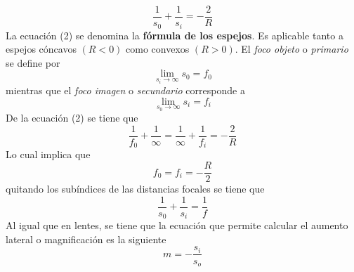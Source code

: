 \documentclass[13,twocolumn,letterpaper]{article}
\begin{document}
{\begin{equation}
\dfrac{1}{s_{0}}+\dfrac{1}{s_{i}}=-\dfrac{2}{R}
\end{equation}
La ecuación (2) se denomina la \textbf{fórmula de los espejos}. Es aplicable tanto a espejos cóncavos $(R<0)$ como convexos $(R>0)$. El \emph{foco objeto } o \emph{primario} se define por 
$$\lim_{s_{i}\rightarrow\infty}s_{0}=f_{0}$$
mientras que el \emph{foco imagen} o \emph{secundario} corresponde a 
$$\lim_{s_{0}\rightarrow\infty}s_{i}=f_{i}$$
De la ecuación (2) se tiene que 
$$\dfrac{1}{f_{0}}+\dfrac{1}{\infty}=\dfrac{1}{\infty}+\dfrac{1}{f_{i}}=-\dfrac{2}{R}$$
Lo cual implica que
\begin{equation}
f_{0}=f_{i}=-\dfrac{R}{2}
\end{equation}
quitando los subíndices de las distancias focales se tiene que 
\begin{equation}\label{ec4}
\dfrac{1}{s_{0}}+\dfrac{1}{s_{i}}=\dfrac{1}{f}
\end{equation} 
Al igual que en lentes, se tiene que la ecuación que permite calcular el aumento lateral o magnificación es la siguiente
\begin{equation}\label{ec11}
m=-\dfrac{s_{i}}{s_{o}}
\end{equation}
}
\end{document}
